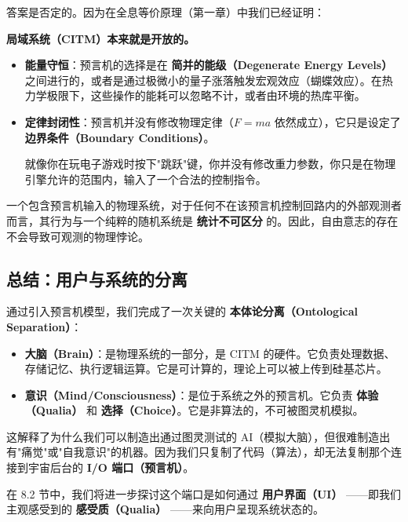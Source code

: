 答案是否定的。因为在全息等价原理（第一章）中我们已经证明：

\textbf{局域系统（CITM）本来就是开放的。}

\begin{itemize}
\item \textbf{能量守恒}：预言机的选择是在 \textbf{简并的能级（Degenerate Energy Levels）} 之间进行的，或者是通过极微小的量子涨落触发宏观效应（蝴蝶效应）。在热力学极限下，这些操作的能耗可以忽略不计，或者由环境的热库平衡。

\item \textbf{定律封闭性}：预言机并没有修改物理定律（$F=ma$ 依然成立），它只是设定了 \textbf{边界条件（Boundary Conditions）}。

    就像你在玩电子游戏时按下"跳跃"键，你并没有修改重力参数，你只是在物理引擎允许的范围内，输入了一个合法的控制指令。
\end{itemize}

\begin{theorem}[因果相容性]
一个包含预言机输入的物理系统，对于任何不在该预言机控制回路内的外部观测者而言，其行为与一个纯粹的随机系统是 \textbf{统计不可区分} 的。因此，自由意志的存在不会导致可观测的物理悖论。
\end{theorem}

\subsection{总结：用户与系统的分离}

通过引入预言机模型，我们完成了一次关键的 \textbf{本体论分离（Ontological Separation）}：

\begin{itemize}
\item \textbf{大脑（Brain）}：是物理系统的一部分，是 CITM 的硬件。它负责处理数据、存储记忆、执行逻辑运算。它是可计算的，理论上可以被上传到硅基芯片。

\item \textbf{意识（Mind/Consciousness）}：是位于系统之外的预言机。它负责 \textbf{体验（Qualia）} 和 \textbf{选择（Choice）}。它是非算法的，不可被图灵机模拟。
\end{itemize}

这解释了为什么我们可以制造出通过图灵测试的 AI（模拟大脑），但很难制造出有"痛觉"或"自我意识"的机器。因为我们只复制了代码（算法），却无法复制那个连接到宇宙后台的 \textbf{I/O 端口（预言机）}。

在 8.2 节中，我们将进一步探讨这个端口是如何通过 \textbf{用户界面（UI）} ——即我们主观感受到的 \textbf{感受质（Qualia）} ——来向用户呈现系统状态的。
